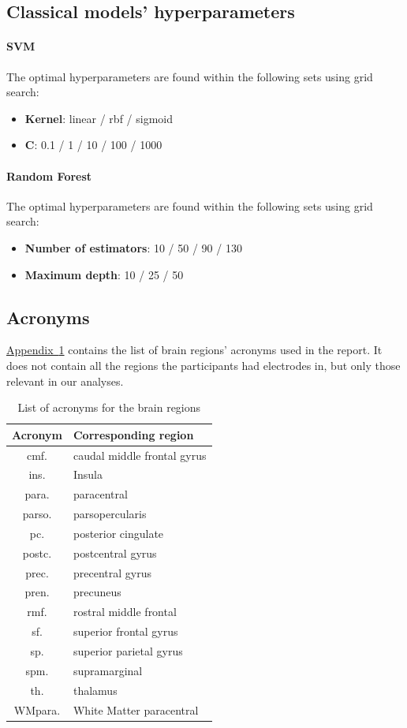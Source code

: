 \documentclass[10pt,conference,compsocconf]{IEEEtran}
\newcommand{\aref}[1]{\hyperref[#1]{Appendix~\ref*{#1}}}
\begin{document}
\subsection{Classical models' hyperparameters}
\label{subsec:mlhyperparams}
\paragraph{SVM}
The optimal hyperparameters are found within the following sets using grid search:
\begin{itemize}
    \item \textbf{Kernel}: linear / rbf / sigmoid
    \item \(\mathbf{C}\): 0.1 / 1 / 10 / 100 / 1000
\end{itemize}
\paragraph{Random Forest}
The optimal hyperparameters are found within the following sets using grid search:
\begin{itemize}
    \item \textbf{Number of estimators}: 10 / 50 / 90 / 130
    \item \textbf{Maximum depth}: 10 / 25 / 50
\end{itemize}

\subsection{Acronyms}
\aref{apptab:acronyms} contains the list of brain regions' acronyms used in the report. It does not contain all the regions the participants had electrodes in, but only those relevant in our analyses.

\begin{table}[h!]
    \centering
    \begin{tabular}{| c | l |}
        \hline
        Acronym & Corresponding region \\
        \hline
        cmf. & caudal middle frontal gyrus \\
        ins. & Insula \\
        para. & paracentral \\
        parso. & parsopercularis \\
        pc. & posterior cingulate \\
        postc. & postcentral gyrus \\
        prec. & precentral gyrus \\
	      pren. & precuneus \\
        rmf. & rostral middle frontal \\
        sf. & superior frontal gyrus \\
	      sp. & superior parietal gyrus \\
	      spm. & supramarginal \\
	      th. & thalamus \\
        WMpara. & White Matter paracentral \\
        \hline
    \end{tabular}
    \caption{List of acronyms for the brain regions}
    \label{apptab:acronyms}
\end{table}
\end{document}
